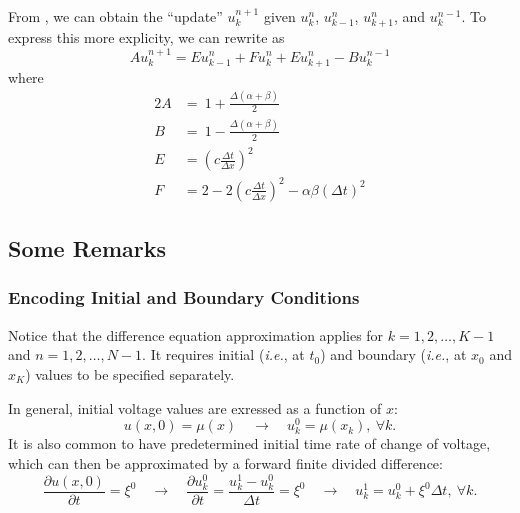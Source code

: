 \documentclass{article}
\begin{document}
From , we can obtain the ``update'' $u_{k}^{n+1}$
given $u_{k}^{n}$, $u_{k-1}^{n}$, $u_{k+1}^{n}$, and $u_{k}^{n-1}$.
To express this more explicity, we can rewrite  as
\begin{equation}
   \label{eqn: Difference eqn short}
   A u_{k}^{n+1} = E u_{k-1}^{n} + F u_{k}^{n} + E u_{k+1}^{n} - B u_{k}^{n-1}
\end{equation}
where
\begin{alignat}{2}
   \label{eqn: A}
   A &=\ 1 + \frac{\Delta \left(\alpha + \beta\right)}{2} \\
   \label{eqn: B}
   B &=\ 1 - \frac{\Delta \left(\alpha + \beta\right)}{2} \\
   \label{eqn: E}
   E &= \left(c \frac{\Delta t}{\Delta x}\right)^{2} \\
   \label{eqn: F}
   F &= 2 - 2 \left(c \frac{\Delta t}{\Delta x}\right)^{2} - \alpha \beta \left(\Delta t\right)^{2}
\end{alignat}

\subsection{Some Remarks}
\label{subsec: Some Remarks}

\subsubsection{Encoding Initial and Boundary Conditions}
\label{subsubsec: Encoding Initial and Boundary Conditions}

Notice that the difference equation approximation applies for $k=1,2,\ldots,K-1$ and $n=1,2,\ldots,N-1$.
It requires initial (\textit{i.e.}, at $t_{0}$) and boundary (\textit{i.e.}, at $x_{0}$ and $x_{K}$) values to be specified separately.

In general, initial voltage values are exressed as a function of $x$:
\begin{equation*}
   u \left(x,0\right) = \mu \left(x\right)
   \quad\longrightarrow\quad
   u_{k}^{0} = \mu \left(x_{k}\right),\ \forall k.
\end{equation*}
It is also common to have predetermined initial time rate of change of voltage,
which can then be approximated by a forward finite divided difference:
\begin{equation*}
   \frac{\partial u \left(x,0\right)}{\partial t} = \xi^{0}
   \quad\longrightarrow\quad
   \frac{\partial u_{k}^{0}}{\partial t} =
   \frac{u_{k}^{1} - u_{k}^{0}}{\Delta t} = \xi^{0}
   \quad\longrightarrow\quad
   u_{k}^{1} = u_{k}^{0} + \xi^{0} \Delta t,\ \forall k.
\end{equation*}
\end{document}
